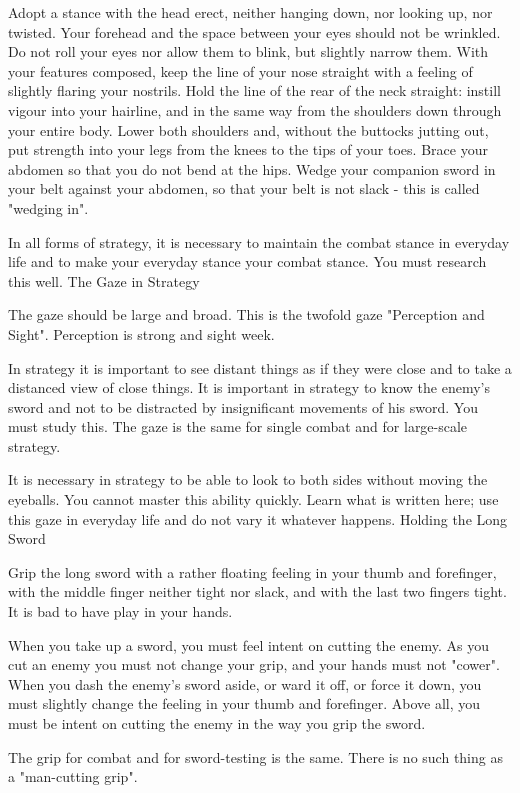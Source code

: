 Adopt a stance with the head erect, neither hanging down, nor looking up, nor twisted. Your forehead and the space between your eyes should not be wrinkled. Do not roll your eyes nor allow them to blink, but slightly narrow them. With your features composed, keep the line of your nose straight with a feeling of slightly flaring your nostrils. Hold the line of the rear of the neck straight: instill vigour into your hairline, and in the same way from the shoulders down through your entire body. Lower both shoulders and, without the buttocks jutting out, put strength into your legs from the knees to the tips of your toes. Brace your abdomen so that you do not bend at the hips. Wedge your companion sword in your belt against your abdomen, so that your belt is not slack - this is called "wedging in".

In all forms of strategy, it is necessary to maintain the combat stance in everyday life and to make your everyday stance your combat stance. You must research this well.
The Gaze in Strategy

The gaze should be large and broad. This is the twofold gaze "Perception and Sight". Perception is strong and sight week.

In strategy it is important to see distant things as if they were close and to take a distanced view of close things. It is important in strategy to know the enemy's sword and not to be distracted by insignificant movements of his sword. You must study this. The gaze is the same for single combat and for large-scale strategy.

It is necessary in strategy to be able to look to both sides without moving the eyeballs. You cannot master this ability quickly. Learn what is written here; use this gaze in everyday life and do not vary it whatever happens.
Holding the Long Sword

Grip the long sword with a rather floating feeling in your thumb and forefinger, with the middle finger neither tight nor slack, and with the last two fingers tight. It is bad to have play in your hands.

When you take up a sword, you must feel intent on cutting the enemy. As you cut an enemy you must not change your grip, and your hands must not "cower". When you dash the enemy's sword aside, or ward it off, or force it down, you must slightly change the feeling in your thumb and forefinger. Above all, you must be intent on cutting the enemy in the way you grip the sword.

The grip for combat and for sword-testing is the same. There is no such thing as a "man-cutting grip".

